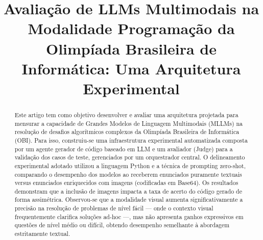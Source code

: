 \documentclass[sigconf,anonymous]{acmart} %
\begin{document}
\title{Avaliação de LLMs Multimodais na Modalidade Programação da Olimpíada Brasileira de Informática: Uma Arquitetura Experimental}


\renewcommand{\shorttitle}{Resolução de Problemas da OBI com LLMs Multimodais}

\begin{abstract}
Este artigo tem como objetivo desenvolver e avaliar uma arquitetura projetada para mensurar a capacidade de Grandes Modelos de Linguagem Multimodais (MLLMs) na resolução de desafios algorítmicos complexos da Olimpíada Brasileira de Informática (OBI). Para isso, construiu-se uma infraestrutura experimental automatizada composta por um agente gerador de código baseado em LLM e um avaliador (Judge) para a validação dos casos de teste, gerenciados por um orquestrador central. O delineamento experimental adotado utilizou a linguagem Python e a técnica de prompting zero-shot, comparando o desempenho dos modelos ao receberem enunciados puramente textuais versus enunciados enriquecidos com imagens (codificadas em Base64). Os resultados demonstram que a inclusão de imagens impacta a taxa de acerto do código gerado de forma assimétrica. Observou-se que a modalidade visual aumenta significativamente a precisão na resolução de problemas de nível fácil — onde o contexto visual frequentemente clarifica soluções ad-hoc —, mas não apresenta ganhos expressivos em questões de nível médio ou difícil, obtendo desempenho semelhante à abordagem estritamente textual.
\end{abstract}


\frenchspacing
\maketitle
\end{document}
